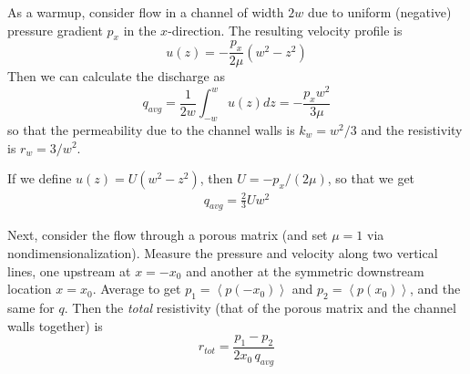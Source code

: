 \documentclass[11pt]{article}
\newcommand{\pup}{p_{1}}
\newcommand{\pdn}{p_{2}}
\newcommand{\qavg}{q_{avg}}
\begin{document}
As a warmup, consider flow in a channel of width $2w$ due to uniform (negative) pressure gradient $p_x$ in the $x$-direction. The resulting velocity profile is
\begin{equation}
u(z) = -\frac{p_x}{2 \mu} (w^2 - z^2)
\end{equation}
Then we can calculate the discharge as
\begin{equation}
\qavg = \frac{1}{2w} \int_{-w}^{w} u(z) dz = - \frac{ p_x w^2}{3 \mu} 
\end{equation}
so that the permeability due to the channel walls is $k_w = w^2/3$ and the resistivity is $r_w = 3/w^2$.

If we define $u(z) = U(w^2 - z^2)$, then $U = -p_x / (2 \mu)$, so that we get
\begin{align}
\qavg = \frac{2}{3} U w^2
\end{align}

Next, consider the flow through a porous matrix (and set $\mu=1$ via nondimensionalization). Measure the pressure and velocity along two vertical lines, one upstream at $x = -x_0$ and another at the symmetric downstream location $x = x_0$. Average to get $\pup = \left<p(-x_0) \right>$ and $\pdn = \left< p(x_0) \right>$, and the same for $q$. Then the {\em total} resistivity (that of the porous matrix and the channel walls together) is 
\begin{equation}
r_{tot} = \frac{\pup - \pdn}{2 x_0 \, \qavg}
\end{equation}
\end{document}
